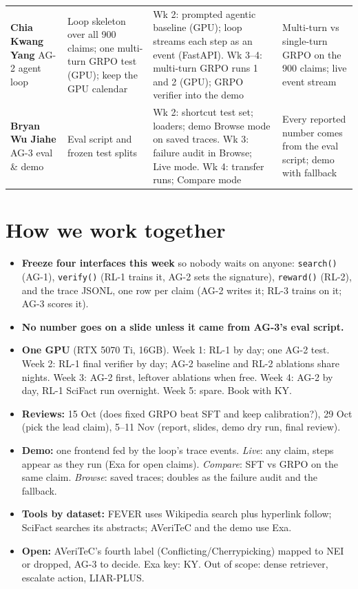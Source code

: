 \documentclass[10pt]{article}
\begin{document}
\begin{tabularx}{\linewidth}{@{}P{2.95cm}P{3.6cm}LP{3.3cm}@{}}
\textbf{Chia Kwang Yang} \newline AG-2 agent loop &
  Loop skeleton over all 900 claims; one multi-turn GRPO test (GPU); keep the GPU calendar &
  Wk 2: prompted agentic baseline (GPU); loop streams each step as an event (FastAPI). Wk 3--4: multi-turn GRPO runs 1 and 2 (GPU); GRPO verifier into the demo &
  Multi-turn vs single-turn GRPO on the 900 claims; live event stream \\
\textbf{Bryan Wu Jiahe} \newline AG-3 eval \& demo &
  Eval script and frozen test splits &
  Wk 2: shortcut test set; loaders; demo Browse mode on saved traces. Wk 3: failure audit in Browse; Live mode. Wk 4: transfer runs; Compare mode &
  Every reported number comes from the eval script; demo with fallback \\
\bottomrule
\end{tabularx}
\normalsize

\section*{How we work together}
\begin{itemize}
  \item \textbf{Freeze four interfaces this week} so nobody waits on anyone: \texttt{search()} (AG-1),
        \texttt{verify()} (RL-1 trains it, AG-2 sets the signature), \texttt{reward()} (RL-2), and the
        trace JSONL, one row per claim (AG-2 writes it; RL-3 trains on it; AG-3 scores it).
  \item \textbf{No number goes on a slide unless it came from AG-3's eval script.}
  \item \textbf{One GPU} (RTX 5070 Ti, 16GB). Week 1: RL-1 by day; one AG-2 test. Week 2: RL-1 final verifier by day; AG-2 baseline and RL-2
        ablations share nights. Week 3: AG-2 first, leftover ablations when free. Week 4: AG-2 by day, RL-1 SciFact run overnight.
        Week 5: spare. Book with KY.
  \item \textbf{Reviews:} 15 Oct (does fixed GRPO beat SFT and keep calibration?), 29 Oct (pick the lead claim),
        5--11 Nov (report, slides, demo dry run, final review).
  \item \textbf{Demo:} one frontend fed by the loop's trace events. \emph{Live}: any claim, steps appear as they run (Exa for open claims).
        \emph{Compare}: SFT vs GRPO on the same claim. \emph{Browse}: saved traces; doubles as the failure audit and the fallback.
  \item \textbf{Tools by dataset:} FEVER uses Wikipedia search plus hyperlink follow; SciFact searches its abstracts; AVeriTeC and the demo use Exa.
  \item \textbf{Open:} AVeriTeC's fourth label (Conflicting/Cherrypicking) mapped to NEI or dropped, AG-3 to decide. Exa key: KY.
        Out of scope: dense retriever, escalate action, LIAR-PLUS.
\end{itemize}
\end{document}
